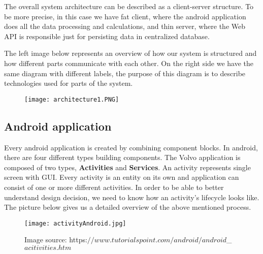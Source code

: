 \documentclass{article}
\begin{document}
The overall system architecture can be described as a client-server structure. To be more precise, in this case we have fat client, where the android application does all the data processing and calculations, and thin server, where the Web API is responsible just for persisting data in centralized database.

The left image below represents an overview of how our system is structured and how different parts communicate with each other. On the right side we have the same diagram with different labels, the purpose of this diagram is to describe technologies used for parts of the system.

\begin{figure}[h!]
\centering
   \texttt{[image: architecture1.PNG]}
\end{figure}

\newpage

\subsection{Android application}

Every android application is created by combining component blocks. In android, there are four different types building components. The Volvo application is composed of two types, \textbf{Activities} and \textbf{Services}. An activity represents single screen with GUI. Every  activity is an entity on its own and application can consist of one or more different activities. In order to be able to better understand design decision, we need to know how an activity's lifecycle looks like. The picture below gives us a detailed overview of the above mentioned process.

\begin{figure}[h!]
\centering
   \texttt{[image: activityAndroid.jpg]}
   \caption{Image source: https:$//www.tutorialspoint.com/android/android$\_$acitivities.htm$}
\end{figure}
\end{document}
